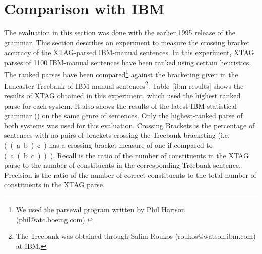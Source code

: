  
 
 
 
 
\section{Comparison with IBM} 
 
The evaluation in this section was done with the earlier 1995 release 
of the grammar. This section describes an experiment to measure the 
crossing bracket accuracy of the XTAG-parsed IBM-manual sentences.  In 
this experiment, XTAG parses of 1100 IBM-manual sentences have been 
ranked using certain heuristics. The ranked parses have been 
compared\footnote{We used the parseval program written by Phil Harison   (phil@atc.boeing.com).}  against the bracketing given in the 
Lancaster Treebank of IBM-manual sentences\footnote{The Treebank was   obtained through Salim Roukos (roukos@watson.ibm.com) at IBM.}. 
Table~\ref{ibm-results} shows the results of XTAG obtained in this 
experiment, which used the highest ranked parse for each system. It 
also shows the results of the latest IBM statistical grammar 
(\cite{jelineketal94}) on the same genre of sentences. Only the 
highest-ranked parse of both systems was used for this evaluation. 
Crossing Brackets is the percentage of sentences with no pairs of 
brackets crossing the Treebank bracketing (i.e.  (~(~a~b~)~c~) has a 
crossing bracket measure of one if compared to (~a~(~b~c~)~)~). Recall 
is the ratio of the number of constituents in the XTAG parse to the 
number of constituents in the corresponding Treebank sentence. 
Precision is the ratio of the number of correct constituents to the 
total number of constituents in the XTAG parse. 
 
